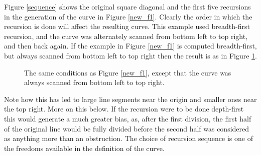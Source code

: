 \documentclass[12pt]{article}
\begin{document}
Figure \ref{sequence} shows the original square diagonal and the first
five recursions in the generation of the curve in Figure \ref{new_f1}.
Clearly the order in which the recursion is done will affect the
resulting curve.  This example used breadth-first recursion, and the
curve was alternately scanned from bottom left to top right, and then
back again.  If the example in Figure \ref{new_f1} is computed
breadth-first, but always scanned from bottom left to top right then
the result is as in Figure \ref{oneway}.  
\begin{figure}[h!]
 \begin{center} 
  \parbox{110mm}{\caption{\label{oneway} The same conditions as Figure
  \ref{new_f1}, except that the curve was always scanned from bottom
  left to top right.}}
\end{center}
\end{figure}
Note how this has led to large line segments near the origin and
smaller ones near the top right.  More on this below.  If the
recursion were to be done depth-first this would generate a much
greater bias, as, after the first division, the first half of the
original line would be fully divided before the second half was
considered as anything more than an obstruction.  The choice of
recursion sequence is one of the freedoms available in the definition
of the curve.
\end{document}
